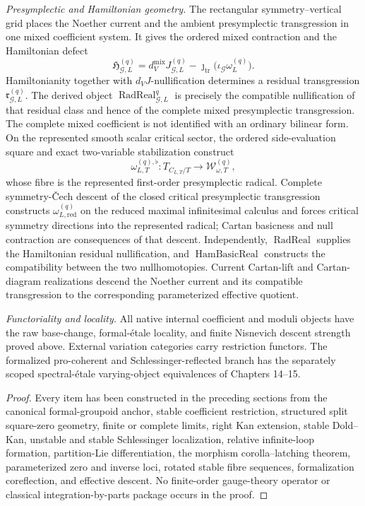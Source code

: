 \begin{theorem}
\medskip
\noindent\emph{Presymplectic and Hamiltonian geometry.}
The rectangular symmetry--vertical grid places the Noether current and the ambient
presymplectic transgression in one mixed coefficient system.  It gives the ordered
mixed contraction and the Hamiltonian defect
\[
\mathfrak H_{\mathcal G,L}^{(q)}
=
 d_V^{\mathrm{mix}}J_{\mathcal G,L}^{(q)}
-
\jmath_{\mathrm{tr}}\bigl(\iota_{\mathcal G}\omega_L^{(q)}\bigr).
\]
Hamiltonianity together with $d_VJ$-nullification determines a residual
transgression $\mathfrak r_{\mathcal G,L}^{(q)}$.  The derived object
$\operatorname{RadReal}_{\mathcal G,L}^{q}$ is precisely the compatible
nullification of that residual class and hence of the complete mixed
presymplectic transgression.  The complete mixed coefficient is not identified with
an ordinary bilinear form.  On the represented smooth scalar critical sector, the
ordered side-evaluation square and exact two-variable stabilization construct
\[
\omega_{L,T}^{(q),\flat}:
T_{C_{L,T}/T}\longrightarrow\mathcal W_{\omega,T}^{(q)},
\]
whose fibre is the represented first-order presymplectic radical.  Complete
symmetry-\v{C}ech descent of the closed critical presymplectic transgression constructs
$\omega_{L,\mathrm{red}}^{(q)}$ on the reduced maximal infinitesimal calculus and
forces critical symmetry directions into the represented radical; Cartan basicness
and null contraction are consequences of that descent.  Independently,
$\operatorname{RadReal}$ supplies the Hamiltonian residual nullification, and
$\operatorname{HamBasicReal}$ constructs the compatibility between the two
nullhomotopies.  Current Cartan-lift and Cartan-diagram realizations descend the
Noether current and its compatible transgression to the corresponding parameterized
effective quotient.

\medskip
\noindent\emph{Functoriality and locality.}
All native internal coefficient and moduli objects have the raw base-change,
formal-\'etale locality, and finite Nisnevich descent strength proved above.
External variation categories carry restriction functors.  The formalized
pro-coherent and Schlessinger-reflected branch has the separately scoped
spectral-\'etale varying-object equivalences of Chapters 14--15.
\end{theorem}

\begin{proof}
Every item has been constructed in the preceding sections from the canonical
formal-groupoid anchor, stable coefficient restriction, structured split
square-zero geometry, finite or complete limits, right Kan extension, stable
Dold--Kan, unstable and stable Schlessinger localization, relative infinite-loop
formation, partition-Lie differentiation, the morphism corolla--latching theorem,
parameterized zero and inverse loci, rotated stable fibre sequences, formalization
coreflection, and effective descent.  No finite-order gauge-theory operator or
classical integration-by-parts package occurs in the proof.
\end{proof}
